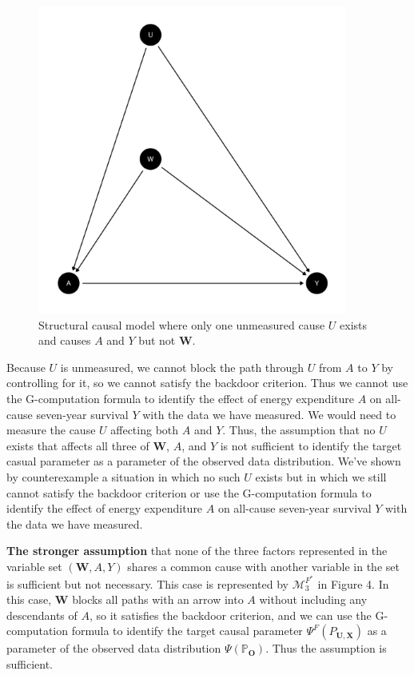 \documentclass{article}\usepackage[]{graphicx}\usepackage[]{xcolor}
\newenvironment{knitrout}{}{} %
\begin{document}
\begin{figure}
  \caption{Structural causal model where only one unmeasured cause $U$ exists and causes $A$ and $Y$ but not $\bm{W}$.}
  \centering

\begin{knitrout}
\color{fgcolor}
\includegraphics[width=4in]{figure/unnamed-chunk-7-1} 

\end{knitrout}

\end{figure}

Because $U$ is unmeasured, we cannot block the path through $U$ from $A$ to $Y$ by controlling for it, so we cannot satisfy the backdoor criterion. Thus we cannot use the G-computation formula to identify the effect of energy expenditure $A$ on all-cause seven-year survival $Y$ with the data we have measured. We would need to measure the cause $U$ affecting both $A$ and $Y$. Thus, the assumption that no $U$ exists that affects all three of $\bm{W}$, $A$, and $Y$ is not sufficient to identify the target casual parameter as a parameter of the observed data distribution. We've shown by counterexample a situation in which no such $U$ exists but in which we still cannot satisfy the backdoor criterion or use the G-computation formula to identify the effect of energy expenditure $A$ on all-cause seven-year survival $Y$ with the data we have measured.

\vspace{2mm}

\textbf{The stronger assumption} that none of the three factors represented in the variable set $(\bm{W}, A, Y)$ shares a common cause with another variable in the set is sufficient but not necessary. This case is represented by $\mathcal{M}^{F^*}_3$ in Figure 4. In this case, $\bm{W}$ blocks all paths with an arrow into $A$ without including any descendants of $A$, so it satisfies the backdoor criterion, and we can use the G-computation formula to identify the target causal parameter $\Psi^F(P_{\bm{U},\bm{X}})$ as a parameter of the observed data distribution $\Psi(\mathbb{P}_{\bm{O}})$. Thus the assumption is sufficient.
\end{document}
